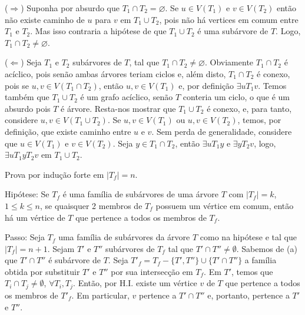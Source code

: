 
($\Rightarrow$) Suponha por absurdo que $T_1 \cap T_2 = \varnothing$.
%
Se $u \in V(T_1)$ e $v \in V(T_2)$ então não existe caminho de $u$ para $v$ em $T_1 \cup T_2$, pois não há vertices em comum entre $T_1$ e $T_2$.
%
Mas isso contraria a hipótese de que $T_1 \cup T_2$ é uma subárvore de $T$.
%
Logo, $T_1 \cap T_2 \ne \varnothing$.

($\Leftarrow$) Seja $T_1$ e $T_2$ subárvores de $T$, tal que $T_1 \cap T_2 \ne \varnothing$. 
%
Obviamente $T_1 \cap T_2$ é acíclico, pois senão ambas árvores teriam ciclos e, além disto, $T_1 \cap T_2$ é conexo, pois se $u,v \in V(T_1 \cap T_2)$, então $u,v \in V(T_1)$ e, por definição $\exists uT_1v$.
%
Temos também que $T_1 \cup T_2$ é um grafo acíclico, senão $T$ conteria um ciclo, o que é um absurdo pois $T$ é árvore.
%
Resta-nos mostrar que $T_1 \cup T_2$ é conexo, e,  para tanto, considere $u,v \in V(T_1 \cup T_2)$.
%
Se $u,v \in V(T_1)$ ou $u,v \in V(T_2)$, temos, por definição, que existe caminho entre $u$ e $v$.
%
Sem perda de generalidade, considere que $u \in V(T_1)$ e $v \in V(T_2)$.
%
Seja $y \in T_1 \cap T_2$, então $\exists uT_1y$ e $\exists yT_2v$, logo, $\exists uT_1yT_2v$ em $T_1 \cup T_2$.
\fimprova

Prova por indução forte em $|T_f| = n$.

Hipótese: Se $T_f$ é uma família de subárvores de uma árvore $T$ com $|T_f| = k$,
$ 1 \le k \le n$, se quaisquer 2 membros de $T_f$ possuem um vértice em comum,
então há um vértice de $T$ que pertence a todos os membros de $T_f$.

Passo: Seja $T_f$ uma família de subárvores da árvore $T$ como na hipótese e tal
que $|T_f| = n + 1$. Sejam $T'$ e $T''$ subárvores de $T_f$ tal que
$T' \cap T'' \ne \emptyset$. Sabemos de (a) que $T' \cap T''$ é subárvore de $T$.
Seja $T'_f = T_f - \{T', T''\} \cup \{T' \cap T''\}$ a família obtida por
substituir $T'$ e $T''$ por sua intersecção em $T_f$. Em $T'$, temos que
$T_i \cap T_j \ne \emptyset$, $\forall T_i, T_j$. Então, por H.I. existe um
vértice $v$ de $T$ que pertence a todos os membros de $T'_f$. Em particular, $v$
pertence a $T' \cap T''$ e, portanto, pertence a $T'$ e $T''$.
\fimprova
